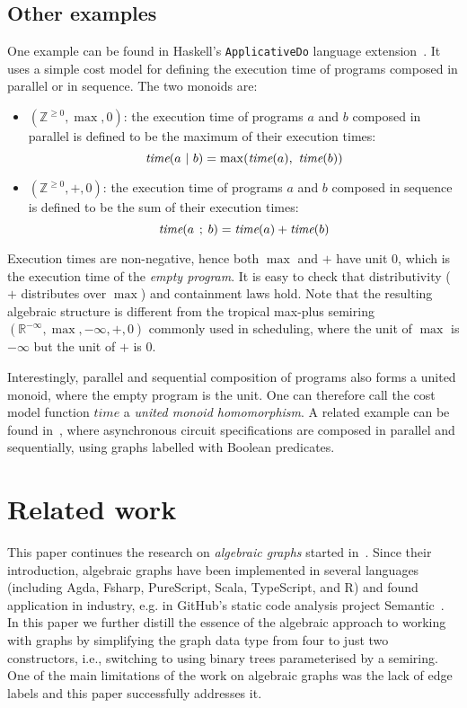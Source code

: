 \documentclass[english,submission]{programming}
\newcommand{\code}[1]{\lstinline[mathescape]|#1|}
\begin{document}
\subsection{Other examples}

One example can be found in Haskell's \code{ApplicativeDo} language
extension~\cite{applicativedo}. It uses a simple cost model for defining the
execution time of programs composed in parallel or in sequence. The two monoids
are:

\begin{itemize}
    \item $(\mathbb{Z}^{\ge 0}, \max, 0)$: the execution time of programs $a$
    and $b$ composed in parallel is defined to be the maximum of their execution
    times:
    \[
    \textit{time}(a\ \text{\code{|}}\ b) = \max(\textit{time}(a),\ \textit{time}(b))
    \]

    \item $(\mathbb{Z}^{\ge 0}, +, 0)$: the execution time of programs $a$ and
    $b$ composed in sequence is defined to be the sum of their execution times:
    \[
    \textit{time}(a\ \text{\code{;}}\ b) = \textit{time}(a) + \textit{time}(b)
    \]
\end{itemize}

\noindent
Execution times are non-negative, hence both $\max$ and $+$ have unit $0$,
which is the execution time of the \emph{empty program}. It is easy to check
that distributivity ($+$ distributes over $\max$) and containment laws hold.
Note that the resulting algebraic structure is different from the tropical
max-plus semiring $(\mathbb{R}^{-\infty}, \max, -\infty, +, 0)$ commonly used in
scheduling, where the unit of $\max$ is $-\infty$ but the unit of $+$ is $0$.

Interestingly, parallel and sequential composition of programs also forms a
united monoid, where the empty program is the unit. One can therefore call the
cost model function $\textit{time}$ a \emph{united monoid homomorphism}.
A related example can be found in~\cite{beaumont2017concepts}, where
asynchronous circuit specifications are composed in parallel and sequentially,
using graphs labelled with Boolean predicates.


\newpage
\section{Related work}\label{sec-related-work}
This paper continues the research on \emph{algebraic graphs} started
in~\cite{mokhov_alga}. Since their introduction, algebraic graphs have been
implemented in several languages (including Agda, Fsharp, PureScript, Scala,
TypeScript, and R) and found application in industry, e.g. in GitHub's static
code analysis project Semantic~\cite{semantic_paper}\cite{semantic_repo}.
In this paper we further distill the essence of the algebraic approach to
working with graphs by simplifying the graph data type from four to just two
constructors, i.e., switching to using binary trees parameterised by a semiring.
One of the main limitations of the work on algebraic graphs was the lack of
edge labels and this paper successfully addresses it.
\end{document}
